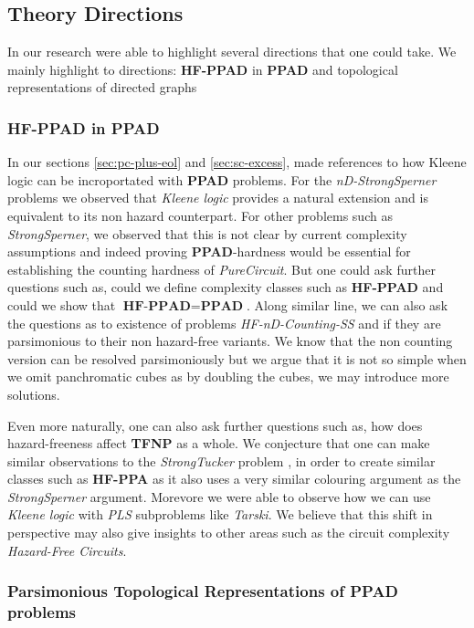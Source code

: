 
\subsection{Theory Directions}
In our research were able to highlight several directions that one could take.
We mainly highlight to directions: \textbf{HF-PPAD} in  \textbf{PPAD}
and topological representations of directed graphs

\subsubsection{\textbf{HF-PPAD} in  \textbf{PPAD}}

In our sections \ref{sec:pc-plus-eol} and \ref{sec:sc-excess}, made references to
how Kleene logic can be incroportated with \textbf{PPAD} problems. For
the \textit{nD-StrongSperner} problems we observed that \textit{Kleene logic}
provides a natural extension and is equivalent to its non hazard counterpart.
For other problems such as \textit{StrongSperner}, we observed that this
is not clear by current complexity assumptions and indeed proving \textbf{PPAD}-hardness
would be essential for establishing the counting hardness of \textit{PureCircuit}.
But one could ask further questions such as, could we define
complexity classes such as \textbf{HF-PPAD} and could we show that
$\textbf{HF-PPAD} = \textbf{PPAD}$.
Along similar line, we can also ask the questions as to existence of problems
\textit{HF-nD-Counting-SS} and if they are parsimonious to their non hazard-free variants.
We know that the non counting version can be resolved parsimoniously
but we argue that it is not so simple when we omit panchromatic cubes as by doubling
the cubes, we may introduce more solutions.


Even more naturally, one can also ask further questions such as, how does hazard-freeness
affect \textbf{TFNP} as a whole. We conjecture that one can make
similar observations to the \textit{StrongTucker} problem \cite{aisenberg_2DTuckerPPA_2020},
in order to create similar classes such as \textbf{HF-PPA} as
it also uses a very similar colouring argument as the \textit{StrongSperner} argument.
Morevore we were able to observe how we can use \textit{Kleene logic} with
\textit{PLS} subproblems like \textit{Tarski}. We believe that this shift
in perspective may also give insights to other areas such as the circuit complexity \textit{Hazard-Free Circuits}.


\subsubsection{Parsimonious Topological Representations of \textbf{PPAD} problems }


